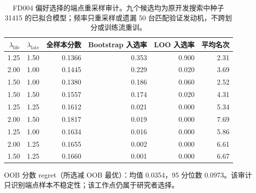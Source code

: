 \begin{table}[!t]
\centering
\scriptsize
\caption{FD004 偏好选择的端点重采样审计。九个候选均为原开发搜索中种子 31415 的已拟合模型；频率只重采样或遗漏 50 台匹配验证发动机，不跨划分或训练流重训。}
\label{tab:preference-selection-stability-zh}
\begin{tabular}{rrrrrr}
\toprule
$\lambda_{\mathrm{life}}$ & $\lambda_{\mathrm{late}}$ & 全样本分数 & Bootstrap 入选率 & LOO 入选率 & 平均名次 \\
\midrule
1.25 & 1.50 & 0.1366 & 0.353 & 0.900 & 2.31 \\
2.00 & 1.00 & 0.1445 & 0.229 & 0.020 & 3.69 \\
1.50 & 1.00 & 0.1380 & 0.186 & 0.060 & 2.52 \\
1.50 & 1.50 & 0.1557 & 0.174 & 0.020 & 4.31 \\
1.25 & 1.25 & 0.1612 & 0.021 & 0.000 & 5.34 \\
2.00 & 1.50 & 0.1817 & 0.019 & 0.000 & 7.69 \\
1.25 & 1.00 & 0.1634 & 0.016 & 0.000 & 5.86 \\
2.00 & 1.25 & 0.1655 & 0.002 & 0.000 & 6.61 \\
1.50 & 1.25 & 0.1660 & 0.001 & 0.000 & 6.67 \\
\bottomrule
\end{tabular}
\par\footnotesize OOB 分数 regret（所选减 OOB 最优）：均值 0.0354，95 分位数 0.0973。该审计只识别端点样本不稳定性；该工作点仍属于研究者选择。
\end{table}
